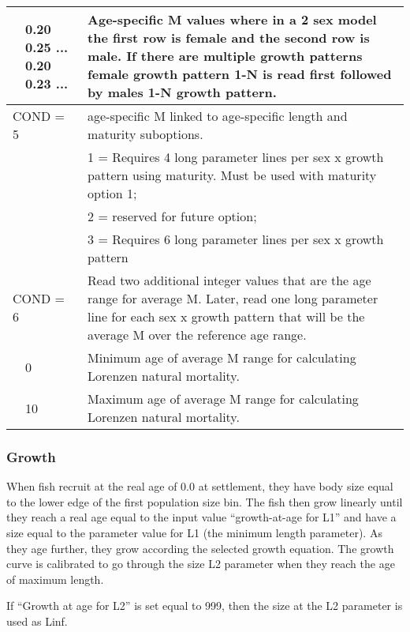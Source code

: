 \begin{longtable}{p{0.5cm} p{2cm} p{12.75cm}}
	& 0.20 0.25 ... 0.20 0.23 ... & Age-specific M values where in a 2 sex model the first row is female and the second row is male. If there are multiple growth patterns female growth pattern 1-N is read first followed by males 1-N growth pattern. \Bstrut\\
	\hline
	
	\multicolumn{2}{l}{COND = 5} \Tstrut & age-specific M linked to age-specific length and maturity suboptions. \\

	&  & 1 = Requires 4 long parameter lines per sex x growth pattern using maturity. Must be used with maturity option 1; \\
	&  & 2 = reserved for future option; \\
	&  & 3 = Requires 6 long parameter lines per sex x growth pattern \Bstrut\\
	\hline

	\multicolumn{2}{l}{COND = 6} \Tstrut & Read two additional integer values that are the age range for average M. Later, read one long parameter line for each sex x growth pattern that will be the average M over the reference age range. \\
	& 0 \Tstrut & Minimum age of average M range for calculating Lorenzen natural mortality. \\
	& 10 \Tstrut & Maximum age of average M range for calculating Lorenzen natural mortality. \\ 
	\hline
\end{longtable}

\subsubsection{Growth}

When fish recruit at the real age of 0.0 at settlement, they have body size equal to the lower edge of the first population size bin. The fish then grow linearly until they reach a real age equal to the input value ``growth-at-age for L1'' and have a size equal to the parameter value for L1 (the minimum length parameter). As they age further, they grow according the selected growth equation. The growth curve is calibrated to go through the size L2 parameter when they reach the age of maximum length.
	
If ``Growth at age for L2'' is set equal to 999, then the size at the L2 parameter is used as Linf. 
	

